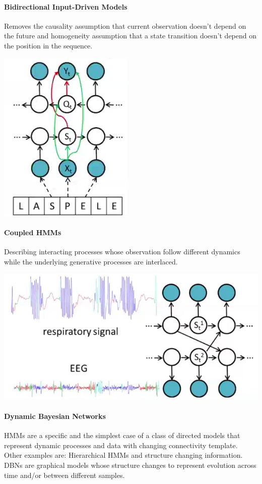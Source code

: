 \documentclass[10pt]{report}
\begin{document}
\paragraph{Bidirectional Input-Driven Models} Removes the causality assumption that current observation doesn't depend on the future and homogeneity assumption that a state transition doesn't depend on the position in the sequence.
\begin{center}
	\includegraphics[scale=0.5]{33.png}
\end{center}
\paragraph{Coupled HMMs} Describing interacting processes whose observation follow different dynamics while the underlying generative processes are interlaced.
\begin{center}
	\includegraphics[scale=0.5]{32.png}
\end{center}
\paragraph{Dynamic Bayesian Networks} HMMs are a specific and the simplest case of a class of directed models that represent dynamic processes and data with changing connectivity template. Other examples are: Hierarchical HMMs and structure changing information.\\
DBNs are graphical models whose structure changes to represent evolution across time and/or between different samples.
\end{document}

